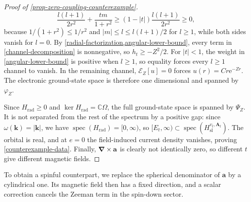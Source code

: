 \documentclass[final,reqno]{amsart}
\DeclareMathOperator{\spec}{spec}
\theoremstyle{remark}
\newcommand{\CC}{\mathbb{C}}
\newcommand{\e}{\mathrm{e}}
\newcommand{\rad}{\mathrm{rad}}
\let\phi=\varphi
\renewcommand{\va}{\mathbf{a}}
\newcommand{\vk}{\mathbf{k}}
\newcommand{\vA}{{\mathbf{A}}}
\begin{document}
\begin{proof}[Proof of \cref{prop-zero-coupling-counterexample}]
\begin{equation}\label{angular-lower-bound}
 \frac{l(l+1)}{2r^2}+\frac{tm}{1+r^2}
 \geq(1-|t|)\frac{l(l+1)}{2r^2}\geq0,
\end{equation}
because $1/(1+r^2)\leq1/r^2$ and $|m|\leq l\leq l(l+1)/2$ for
$l\geq1$, while both sides vanish for $l=0$.  By
\cref{radial-factorization,angular-lower-bound}, every term in
\cref{channel-decomposition} is nonnegative, so $h_t\geq-Z^2/2$.  For
$|t|<1$, the weight in \cref{angular-lower-bound} is positive when
$l\geq1$, so equality forces every $l\geq1$ channel to vanish.  In the remaining channel, $\mathcal E_Z[u]=0$ forces
$u(r)=C r \e^{-Zr}$.  The electronic ground-state space is therefore
one dimensional and spanned by $\phi_Z$.

Since $H_\rad\geq0$ and $\ker H_\rad=\CC\Omega$, the full
ground-state space is spanned by $\Psi_Z$.  It is not separated
from the rest of the spectrum by a positive gap: since
$\omega(\vk)=|\vk|$, we have $\spec(H_\rad)=[0,\infty)$, so
$[E_t,\infty)\subset\spec(H_{\mathrm{sl}}^{v_t,\vA_t})$.  The orbital is real, and at $e=0$ the field-induced current density
vanishes, proving \cref{counterexample-data}.  Finally, $\grad\times\va$ is
clearly not identically zero, so different $t$ give different magnetic
fields.
\end{proof}

To obtain a spinful counterpart, we replace the spherical denominator
of $\va$ by a cylindrical one.  Its magnetic field then has a fixed
direction, and a scalar correction cancels the Zeeman term in the
spin-down sector.
\end{document}
